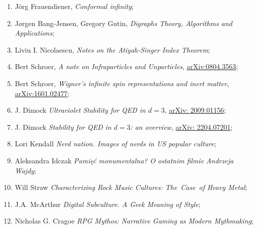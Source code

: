 \documentclass[a4paper,11pt]{article}
\begin{document}
\begin{enumerate}
\item J\"{o}rg Frauendiener, \textit{Conformal infinity};



\item J\o rgen Bang-Jensen, Gregory Gutin, \textit{Digraphs Theory,
    Algorithms and Applications};



\item Liviu I. Nicolaescu, \textit{Notes on the Atiyah-Singer Index
    Theorem};



\item Bert Schroer, \textit{A note on Infraparticles and Unparticles},
  \href{https://arxiv.org/abs/0804.3563}{arXiv:0804.3563};



\item Bert Schroer, \textit{Wigner's infinite spin representations and
    inert matter},
  \href{https://arxiv.org/abs/1601.02477}{arXiv:1601.02477};



\item J. Dimock \textit{Ultraviolet Stability for QED in $d = 3$},
  \href{https://arxiv.org/abs/2009.01156}{arXiv: 2009.01156};



\item J. Dimock \textit{Stability for QED in $d = 3$: an overview},
  \href{https://arxiv.org/abs/2204.07201}{arXiv: 2204.07201};



\item Lori Kendall \textit{Nerd nation. Images of nerds in US popular
    culture};



\item Aleksandra Idczak \textit{Pamięć monumentalna? O ostatnim filmie
    Andrzeja Wajdy};



\item Will Straw \textit{Characterizing Rock Music Cultures: The~Case~of
  Heavy Metal};



\item J.A. McArthur \textit{Digital Subculture. A Geek Meaning of Style};



\item Nicholas G. Cragoe \textit{RPG Mythos: Narrative Gaming as
    Modern Mythmaking};




\end{enumerate}
\end{document}
